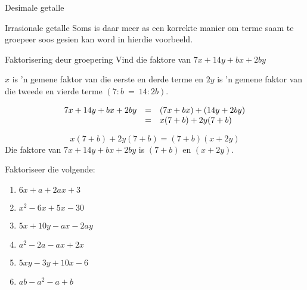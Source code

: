\begin{Aktiwiteit}{Desimale getalle}
\begin{aktiwiteit}{Irrasionale getalle}
Soms is daar meer as een korrekte manier om terme saam te groepeer soos gesien kan word in hierdie voorbeeld.

\begin{wex}{Faktorisering deur groepering  }{Vind die faktore van $7x+14y+bx+2by$}
{


$x$ is 'n gemene faktor van die eerste en derde terme en $2y$ is 'n gemene faktor van die tweede en vierde terme $(7:b~=~14:2b)$.\par 
{}

\begin{equation*}
 \begin{array}{ccl}

7x+14y+bx+2by&=& (7x+bx)+(14y+2by)  \hfill\\ 
&=&x(7+b)+2y(7+b) \hfill 
\end{array}
\end{equation*}


\begin{equation*}
x(7+b)+2y(7+b) = (7+b)(x+2y)
\end{equation*}
Die faktore van $7x+14y+bx+2by$ is $(7+b)$ en $(x+2y)$.

}
\end{wex}





\begin{exercises}{}{
\nopagebreak
Faktoriseer die volgende:
\begin{multicols}{2}
\begin{enumerate}[itemsep=5pt, label=\textbf{\arabic*}. ] 
\item $6x+a+2ax+3$
\item ${x}^{2}-6x+5x-30$
\item $5x+10y-ax-2ay$
\item ${a}^{2}-2a-ax+2x$
\item $5xy-3y+10x-6$
\item $ab - a^{2} - a + b$
\end{enumerate}
\end{multicols}

}
\end{exercises}


\end{aktiwiteit}
\end{Aktiwiteit}
